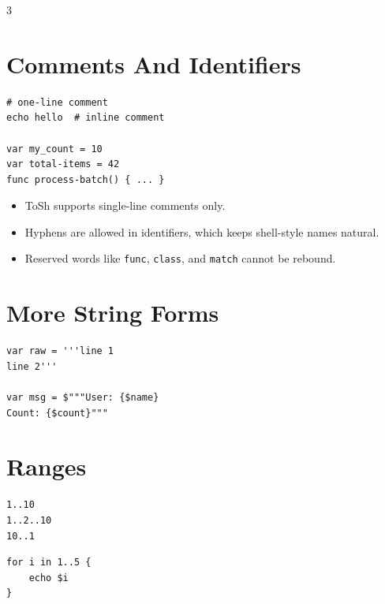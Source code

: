 
\begin{multicols*}{3}

\section{Comments And Identifiers}
\begin{lstlisting}
# one-line comment
echo hello  # inline comment

var my_count = 10
var total-items = 42
func process-batch() { ... }
\end{lstlisting}

\begin{itemize}
\item ToSh supports single-line comments only.
\item Hyphens are allowed in identifiers, which keeps shell-style names natural.
\item Reserved words like \texttt{func}, \texttt{class}, and \texttt{match} cannot be rebound.
\end{itemize}

\section{More String Forms}

\begin{lstlisting}
var raw = '''line 1
line 2'''

var msg = $"""User: {$name}
Count: {$count}"""
\end{lstlisting}

\section{Ranges}
\begin{lstlisting}
1..10
1..2..10
10..1
\end{lstlisting}

\begin{lstlisting}
for i in 1..5 {
    echo $i
}
\end{lstlisting}


\end{multicols*}
